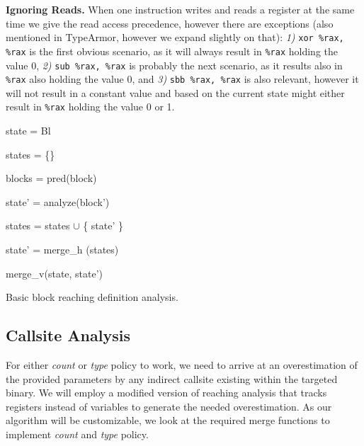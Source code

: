 \textbf{Ignoring Reads.} When one instruction writes and reads a register at the same time we give the read access precedence, however there are exceptions (also mentioned in TypeArmor, however we expand slightly on that):
\textit{1)} \texttt{xor \%rax, \%rax} is the first obvious scenario, as it will always result in \texttt{\%rax} holding the value 0,
\textit{2)} \texttt{sub \%rax, \%rax} is probably the next scenario, as it results also in \texttt{\%rax} also holding the value 0, and
\textit{3)} \texttt{sbb \%rax, \%rax} is also relevant, however it will not result in a constant value and based on the current state might either result in \texttt{\%rax} holding the value 0 or 1.

\begin{algorithm}[!ht]
	\SetAlgoLined
        \BlankLine
	{
 	state = Bl                                   
 	

	states = \{\}                                
	
	blocks = pred(block)                         
	
	 {
	
 		state' = analyze(block')             
 		
		states = states $\cup$ \{ state' \}  
	}

	state' = merge\_h (states)                   

	\Return merge\_v(state, state')              

	}
\caption{Basic block reaching definition analysis.}
\label{alg:reaching}
\end{algorithm}

\subsection{Callsite Analysis}
\label{section:callsiteanalysis}
For either \emph{count} or \emph{type} policy to work, we need to arrive at an overestimation of the provided parameters by any indirect 
callsite existing within the targeted binary. We will employ a modified version of reaching analysis that tracks registers instead of 
variables to generate the needed overestimation. As our algorithm will be customizable, we look at the required merge functions to 
implement \emph{count} and \emph{type} policy. 

